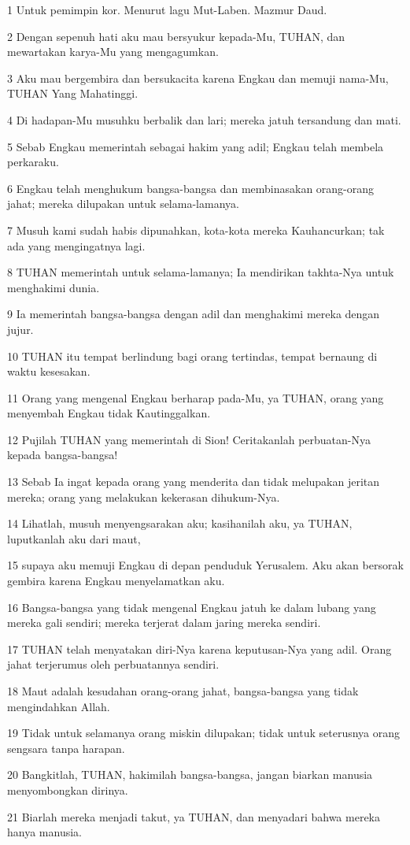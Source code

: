 \par 1 Untuk pemimpin kor. Menurut lagu Mut-Laben. Mazmur Daud.
\par 2 Dengan sepenuh hati aku mau bersyukur kepada-Mu, TUHAN, dan mewartakan karya-Mu yang mengagumkan.
\par 3 Aku mau bergembira dan bersukacita karena Engkau dan memuji nama-Mu, TUHAN Yang Mahatinggi.
\par 4 Di hadapan-Mu musuhku berbalik dan lari; mereka jatuh tersandung dan mati.
\par 5 Sebab Engkau memerintah sebagai hakim yang adil; Engkau telah membela perkaraku.
\par 6 Engkau telah menghukum bangsa-bangsa dan membinasakan orang-orang jahat; mereka dilupakan untuk selama-lamanya.
\par 7 Musuh kami sudah habis dipunahkan, kota-kota mereka Kauhancurkan; tak ada yang mengingatnya lagi.
\par 8 TUHAN memerintah untuk selama-lamanya; Ia mendirikan takhta-Nya untuk menghakimi dunia.
\par 9 Ia memerintah bangsa-bangsa dengan adil dan menghakimi mereka dengan jujur.
\par 10 TUHAN itu tempat berlindung bagi orang tertindas, tempat bernaung di waktu kesesakan.
\par 11 Orang yang mengenal Engkau berharap pada-Mu, ya TUHAN, orang yang menyembah Engkau tidak Kautinggalkan.
\par 12 Pujilah TUHAN yang memerintah di Sion! Ceritakanlah perbuatan-Nya kepada bangsa-bangsa!
\par 13 Sebab Ia ingat kepada orang yang menderita dan tidak melupakan jeritan mereka; orang yang melakukan kekerasan dihukum-Nya.
\par 14 Lihatlah, musuh menyengsarakan aku; kasihanilah aku, ya TUHAN, luputkanlah aku dari maut,
\par 15 supaya aku memuji Engkau di depan penduduk Yerusalem. Aku akan bersorak gembira karena Engkau menyelamatkan aku.
\par 16 Bangsa-bangsa yang tidak mengenal Engkau jatuh ke dalam lubang yang mereka gali sendiri; mereka terjerat dalam jaring mereka sendiri.
\par 17 TUHAN telah menyatakan diri-Nya karena keputusan-Nya yang adil. Orang jahat terjerumus oleh perbuatannya sendiri.
\par 18 Maut adalah kesudahan orang-orang jahat, bangsa-bangsa yang tidak mengindahkan Allah.
\par 19 Tidak untuk selamanya orang miskin dilupakan; tidak untuk seterusnya orang sengsara tanpa harapan.
\par 20 Bangkitlah, TUHAN, hakimilah bangsa-bangsa, jangan biarkan manusia menyombongkan dirinya.
\par 21 Biarlah mereka menjadi takut, ya TUHAN, dan menyadari bahwa mereka hanya manusia.

